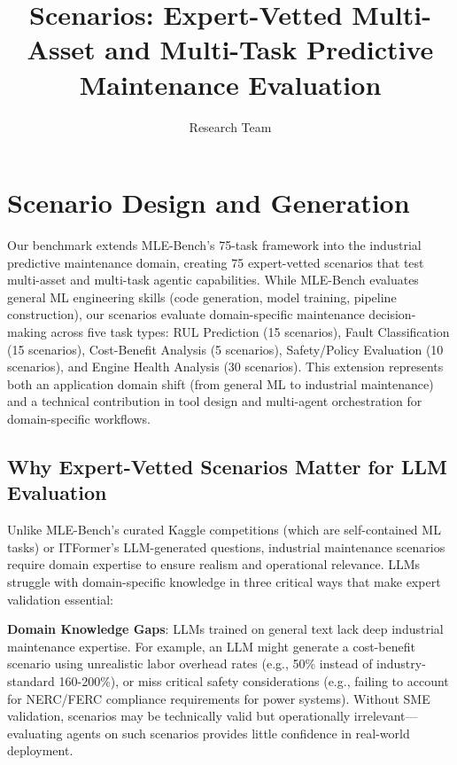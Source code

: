 \documentclass[conference]{IEEEtran}
\begin{document}
\title{Scenarios: Expert-Vetted Multi-Asset and Multi-Task Predictive Maintenance Evaluation}

\author{Research Team}

\maketitle

\section{Scenario Design and Generation}

Our benchmark extends MLE-Bench's \cite{patil2024mlebench} 75-task framework into the industrial predictive maintenance domain, creating 75 expert-vetted scenarios that test multi-asset and multi-task agentic capabilities. While MLE-Bench evaluates general ML engineering skills (code generation, model training, pipeline construction), our scenarios evaluate domain-specific maintenance decision-making across five task types: RUL Prediction (15 scenarios), Fault Classification (15 scenarios), Cost-Benefit Analysis (5 scenarios), Safety/Policy Evaluation (10 scenarios), and Engine Health Analysis (30 scenarios). This extension represents both an application domain shift (from general ML to industrial maintenance) and a technical contribution in tool design and multi-agent orchestration for domain-specific workflows.

\subsection{Why Expert-Vetted Scenarios Matter for LLM Evaluation}

Unlike MLE-Bench's curated Kaggle competitions (which are self-contained ML tasks) or ITFormer's \cite{lei2024itformer} LLM-generated questions, industrial maintenance scenarios require domain expertise to ensure realism and operational relevance. LLMs struggle with domain-specific knowledge in three critical ways that make expert validation essential:

\textbf{Domain Knowledge Gaps}: LLMs trained on general text lack deep industrial maintenance expertise. For example, an LLM might generate a cost-benefit scenario using unrealistic labor overhead rates (e.g., 50\% instead of industry-standard 160-200\%), or miss critical safety considerations (e.g., failing to account for NERC/FERC compliance requirements for power systems). Without SME validation, scenarios may be technically valid but operationally irrelevant—evaluating agents on such scenarios provides little confidence in real-world deployment.
\end{document}

